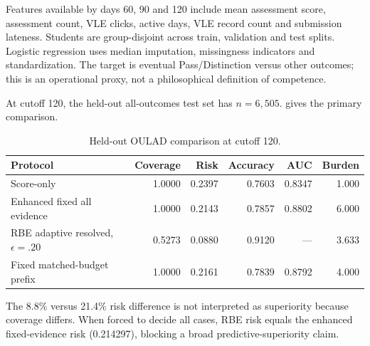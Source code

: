 \documentclass[11pt]{article}
\begin{document}
Features available by days 60, 90 and 120 include mean assessment score, assessment count, VLE clicks, active days, VLE record count and submission lateness. Students are group-disjoint across train, validation and test splits. Logistic regression uses median imputation, missingness indicators and standardization. The target is eventual Pass/Distinction versus other outcomes; this is an operational proxy, not a philosophical definition of competence.

At cutoff 120, the held-out all-outcomes test set has $n=6{,}505$.  gives the primary comparison.
\begin{table}[t]\centering\caption{Held-out OULAD comparison at cutoff 120.}\label{tab:oulad}
\small\begin{tabular}{lrrrrr}\toprule Protocol&Coverage&Risk&Accuracy&AUC&Burden\\\midrule
Score-only&1.0000&0.2397&0.7603&0.8347&1.000\\Enhanced fixed all evidence&1.0000&0.2143&0.7857&0.8802&6.000\\RBE adaptive resolved, $\epsilon=.20$&0.5273&0.0880&0.9120&---&3.633\\Fixed matched-budget prefix&1.0000&0.2161&0.7839&0.8792&4.000\\\bottomrule\end{tabular}\end{table}
The 8.8\% versus 21.4\% risk difference is not interpreted as superiority because coverage differs. When forced to decide all cases, RBE risk equals the enhanced fixed-evidence risk (0.214297), blocking a broad predictive-superiority claim.
\end{document}
